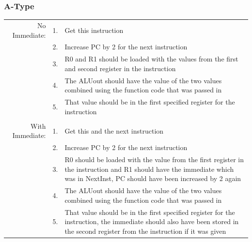 \documentclass{article}
\begin{document}
		\subsubsection{A-Type}
			\begin{tabular}{ r  r  p{12cm} }
					No Immediate:   & 1. & Get this instruction\\
					                & 2. & Increase PC by 2 for the next instruction\\
					                & 3. & R0 and R1 should be loaded with the values from the first and second register in the instruction\\
					                & 4. & The ALUout should have the value of the two values combined using the function code that was passed in\\
					                & 5. & That value should be in the first specified register for the instruction\\ 
					                &    & \\
					With Immediate: & 1. & Get this and the next instruction\\
					                & 2. & Increase PC by 2 for the next instruction\\
					                & 3. & R0 should be loaded with the value from the first register in the instruction and R1 should have the immediate which was in NextInst, PC should have been increased by 2 again\\
					                & 4. & The ALUout should have the value of the two values combined using the function code that was passed in\\
					                & 5. & That value should be in the first specified register for the instruction, the immediate should also have been stored in the second register from the instruction if it was given\\
			\end{tabular}
\end{document}
